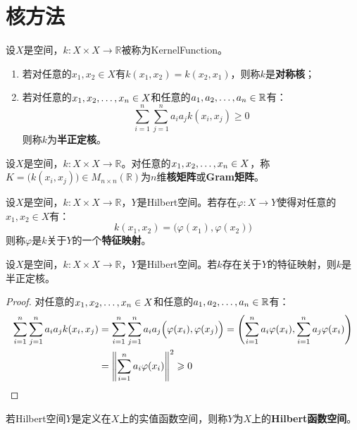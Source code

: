 \section{核方法}

\begin{definition}
	设$X$是空间，$k:X\times X\to\mathbb{R}$被称为\gls{KernelFunction}。
	\begin{enumerate}
		\item 若对任意的$x_1,x_2\in X$有$k(x_1,x_2)=k(x_2,x_1)$，则称$k$是\textbf{对称核}；
		\item 若对任意的$x_1, x_2, \dots, x_{n}\in X$和任意的$a_1, a_2, \dots, a_{n}\in\mathbb{R}$有：
		\begin{equation*}
			\sum_{i=1}^{n}\sum_{j=1}^{n}a_ia_jk(x_i,x_j)\geqslant0
		\end{equation*}
		则称$k$为\textbf{半正定核}。
	\end{enumerate}
\end{definition}
\begin{definition}
	设$X$是空间，$k:X\times X\to\mathbb{R}$。对任意的$x_1, x_2, \dots, x_{n}\in X$，称$K=\Big(k(x_i,x_j)\Big)\in M_{n\times n}(\mathbb{R})$为$n$维\textbf{核矩阵}或\textbf{Gram矩阵}。
\end{definition}
\begin{definition}
	设$X$是空间，$k:X\times X\to\mathbb{R}$，$Y$是Hilbert空间。若存在$\varphi:X\to Y$使得对任意的$x_1,x_2\in X$有：
	\begin{equation*}
		k(x_1,x_2)=\Big(\varphi(x_1),\varphi(x_2)\Big)
	\end{equation*}
	则称$\varphi$是$k$关于$Y$的一个\textbf{特征映射}。
\end{definition}
\begin{theorem}\label{theo:FeatureMapPositiveSemidefiniteKernel}
	设$X$是空间，$k:X\times X\to\mathbb{R}$，$Y$是Hilbert空间。若$k$存在关于$Y$的特征映射，则$k$是半正定核。
\end{theorem}
\begin{proof}
	对任意的$x_1, x_2, \dots, x_{n}\in X$和任意的$a_1, a_2, \dots, a_{n}\in\mathbb{R}$有：
	\begin{align*}
		\sum_{i=1}^{n}\sum_{j=1}^{n}a_ia_jk(x_i,x_j)&=\sum_{i=1}^{n}\sum_{j=1}^{n}a_ia_j\Big(\varphi(x_i),\varphi(x_j)\Big)=\left(\sum_{i=1}^{n}a_i\varphi(x_i),\sum_{i=1}^{n}a_j\varphi(x_i)\right) \\
		&=\left\|\sum_{i=1}^{n}a_i\varphi(x_i)\right\|^2\geqslant0\qedhere
	\end{align*}
\end{proof}
\begin{definition}
	若Hilbert空间$Y$是定义在$X$上的实值函数空间，则称$Y$为$X$上的\textbf{Hilbert函数空间}。
\end{definition}
